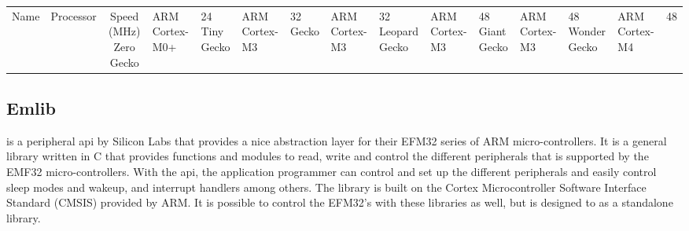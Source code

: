 \begin{centering}
\begin{tabular}{c|c|c}
Name & Processor & Speed (MHz)
Zero Gecko    & ARM Cortex-M0+ & 24
Tiny Gecko    & ARM Cortex-M3  & 32
Gecko         & ARM Cortex-M3  & 32
Leopard Gecko & ARM Cortex-M3  & 48
Giant Gecko   & ARM Cortex-M3  & 48
Wonder Gecko  & ARM Cortex-M4  & 48
\caption{EFM32}
\label{tab:efm32_family}
\end{tabular}
\end{centering}



\subsection{Emlib} %
\label{sub:emlib}

\emlib is a peripheral \gls{api} by Silicon Labs that provides a nice abstraction
layer for their EFM32 series of ARM micro-controllers. It is a general library written in C that
provides functions and modules to read, write and control the different peripherals that is
supported by the EMF32 micro-controllers. With the \gls{api}, the application programmer can control
and set up the different peripherals and easily control sleep modes and wakeup, and interrupt
handlers among others. The library is built on the Cortex Microcontroller Software Interface Standard
(CMSIS) provided by ARM. It is possible to control the EFM32's with these libraries as well, but
\emlib is designed to as a standalone library.

